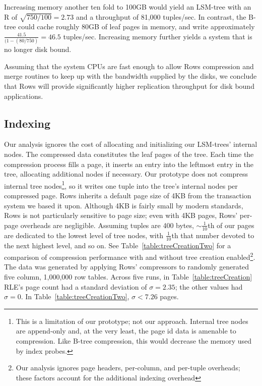 \documentclass{sig-alternate-sigmod08}
\newcommand{\rows}{Rows\xspace}
\newcommand{\rowss}{Rows'\xspace}
\begin{document}

Increasing memory another ten fold to 100GB would yield an LSM-tree
with an R of $\sqrt{750/100} = 2.73$ and a throughput of 81,000
tuples/sec.  In contrast, the B-tree could cache roughly 80GB of leaf pages
in memory, and write approximately $\frac{41.5}{(1-(80/750)} = 46.5$
tuples/sec.  Increasing memory further yields a system that
is no longer disk bound.

Assuming that the system CPUs are fast enough to allow \rows
compression and merge routines to keep up with the bandwidth supplied
by the disks, we conclude that \rows will provide significantly higher
replication throughput for disk bound applications.

\subsection{Indexing}

Our analysis ignores the cost of allocating and initializing our
LSM-trees' internal nodes.  The compressed data constitutes the leaf
pages of the tree.  Each time the compression process fills a page, it
inserts an entry into the leftmost entry in the tree, allocating
additional nodes if necessary.  Our prototype does not compress
internal tree nodes\footnote{This is a limitation of our prototype;
  not our approach.  Internal tree nodes are append-only and, at the
  very least, the page id data is amenable to compression. Like B-tree
  compression, this would decrease the memory used by index probes.},
so it writes one tuple into the tree's internal nodes per compressed
page.  \rows inherits a default page size of 4KB from the transaction
system we based it upon.  Although 4KB is fairly small by modern
standards, \rows is not particularly sensitive to page size; even with
4KB pages, \rowss per-page overheads are negligible.  Assuming tuples
are 400 bytes, $\sim\frac{1}{10}$th of our pages are dedicated to the
lowest level of tree nodes, with $\frac{1}{10}$th that number devoted
to the next highest level, and so on.  See
Table~\ref{table:treeCreationTwo} for a comparison of compression
performance with and without tree creation enabled\footnote{Our
  analysis ignores page headers, per-column, and per-tuple overheads;
  these factors account for the additional indexing overhead}.  The
data was generated by applying \rowss compressors to randomly
generated five column, 1,000,000 row tables.  Across five runs, in
Table~\ref{table:treeCreation} RLE's page count had a standard
deviation of $\sigma=2.35$; the other values had $\sigma=0$.  In
Table~\ref{table:treeCreationTwo}, $\sigma < 7.26$ pages.
\end{document}
